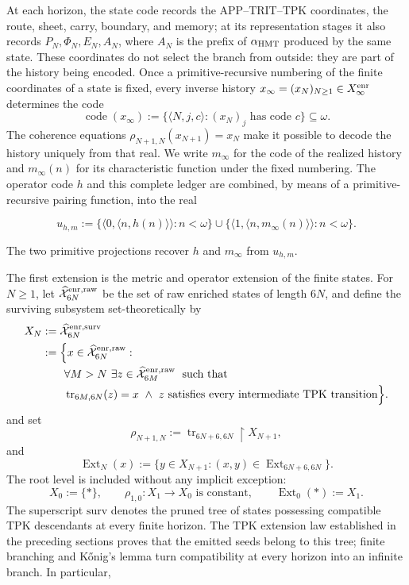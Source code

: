 At each horizon, the state code records the APP--TRIT--TPK coordinates, the
route, sheet, carry, boundary, and memory; at its representation stages it also
records \(P_N,\Phi_N,E_N,A_N\), where \(A_N\) is the prefix of
\(\alpha_{\rm HMT}\) produced by the same state. These coordinates do not
select the branch from outside: they are part of the history being encoded.
Once a primitive-recursive numbering of the finite coordinates of a state is
fixed, every inverse history
\(x_\infty=(x_N)_{N\geq1}\in X_\infty^{\rm enr}\) determines the code
\[
 \operatorname{code}(x_\infty)
 :=\{\langle N,j,c\rangle:(x_N)_j\text{ has code }c\}\subseteq\omega.
\]
The coherence equations
\(\rho_{N+1,N}(x_{N+1})=x_N\) make it possible to decode the history uniquely
from that real. We write \(m_\infty\) for the code of the realized history and
\(m_\infty(n)\) for its characteristic function under the fixed numbering.
The operator code \(h\) and this complete ledger are combined, by means of a
primitive-recursive pairing function, into the real

\[
 u_{h,m}:=
 \{\langle0,\langle n,h(n)\rangle\rangle:n<\omega\}
 \cup
 \{\langle1,\langle n,m_\infty(n)\rangle\rangle:n<\omega\}.
\tag{33a}\label{eq:ch-codigo-conjunto}
\]

The two primitive projections recover \(h\) and \(m_\infty\) from
\(u_{h,m}\).

The first extension is the metric and operator extension of the finite states.
For \(N\ge1\), let \(\widehat{\mathcal X}^{\rm enr,raw}_{6N}\) be the set of
raw enriched states of length \(6N\), and define the surviving subsystem
set-theoretically by
\[
\begin{aligned}
 X_N
 &:=\widehat{\mathcal X}^{\rm enr,surv}_{6N}\\
 &:=\Bigl\{x\in\widehat{\mathcal X}^{\rm enr,raw}_{6N}:\\[-.2ex]
 &\qquad\forall M>N\ \exists z\in
   \widehat{\mathcal X}^{\rm enr,raw}_{6M}\;\text{ such that}\\[-.2ex]
 &\qquad\operatorname{tr}_{6M,6N}(z)=x\ \wedge\
   z\text{ satisfies every intermediate TPK transition}\Bigr\}.
\end{aligned}
\]
and set
\[
 \rho_{N+1,N}:=\operatorname{tr}_{6N+6,6N}\!\upharpoonright X_{N+1},
\]
and
\[
 \operatorname{Ext}_N(x):=
 \{y\in X_{N+1}:(x,y)\in
 \operatorname{Ext}_{6N+6,6N}\}.
\]
The root level is included without any implicit exception:
\[
 X_0:=\{\ast\},\qquad
 \rho_{1,0}:X_1\to X_0\text{ is constant},\qquad
 \operatorname{Ext}_0(\ast):=X_1.
\]
The superscript \(\mathrm{surv}\) denotes the pruned tree of states possessing
compatible TPK descendants at every finite horizon. The TPK extension law
established in the preceding sections proves that the emitted seeds belong to
this tree; finite branching and Kőnig's lemma turn compatibility at every
horizon into an infinite branch. In particular,

